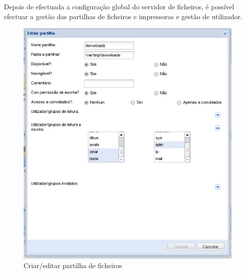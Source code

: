 Depois de efectuada a configuração global do servidor de ficheiros, é possível efectuar a gestão das partilhas de ficheiros e impressoras e gestão de utilizador.

\begin{figure}[H]
    \begin{center}
    \includegraphics[scale=0.38]{screenshots/etfs/etfs_edit_file_share.png}
    \caption{Criar/editar partilha de ficheiros}
    \label{fig:etfs_edit_file_share}
    \end{center}
\end{figure}

